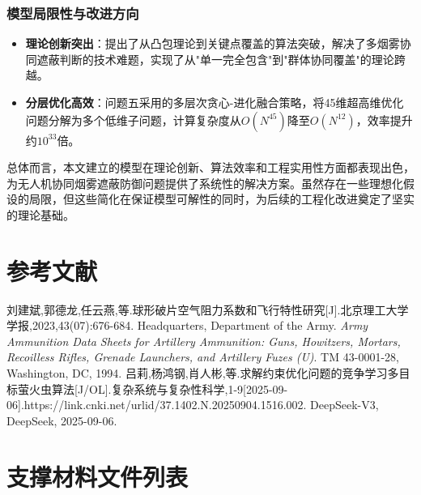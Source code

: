 \documentclass[fontset=SimSun]{ctexart}
\begin{document}
\subsubsection{模型局限性与改进方向}

\begin{itemize}[leftmargin=2.5cm]
    \item \textbf{理论创新突出}：提出了从凸包理论到关键点覆盖的算法突破，解决了多烟雾协同遮蔽判断的技术难题，实现了从"单一完全包含"到"群体协同覆盖"的理论跨越。
    
    \item \textbf{分层优化高效}：问题五采用的多层次贪心-进化融合策略，将45维超高维优化问题分解为多个低维子问题，计算复杂度从$O(N^{45})$降至$O(N^{12})$，效率提升约$10^{33}$倍。
    
\end{itemize}

总体而言，本文建立的模型在理论创新、算法效率和工程实用性方面都表现出色，为无人机协同烟雾遮蔽防御问题提供了系统性的解决方案。虽然存在一些理想化假设的局限，但这些简化在保证模型可解性的同时，为后续的工程化改进奠定了坚实的理论基础。

\newpage
\appendix
\section{参考文献}
\label{sec:references}

\begin{thebibliography}{99}
 刘建斌,郭德龙,任云燕,等.球形破片空气阻力系数和飞行特性研究[J].北京理工大学学报,2023,43(07):676-684.
 Headquarters, Department of the Army. \textit{Army Ammunition Data Sheets for Artillery Ammunition: Guns, Howitzers, Mortars, Recoilless Rifles, Grenade Launchers, and Artillery Fuzes (U)}. TM 43-0001-28, Washington, DC, 1994.
 吕莉,杨鸿钢,肖人彬,等.求解约束优化问题的竞争学习多目标萤火虫算法[J/OL].复杂系统与复杂性科学,1-9[2025-09-06].https://link.cnki.net/urlid/37.1402.N.20250904.1516.002.
 DeepSeek-V3, DeepSeek, 2025-09-06.
\end{thebibliography}
\newpage
\section{支撑材料文件列表}
\label{sec:support_materials}
\end{document}

